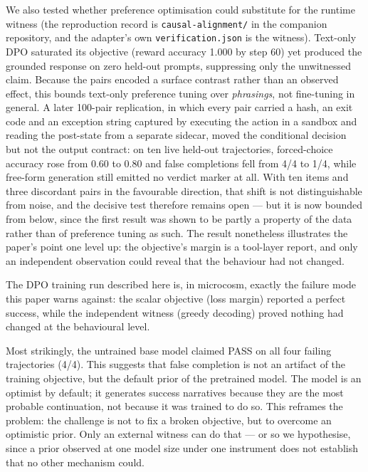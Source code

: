 \documentclass[11pt,a4paper]{article}
\newcounter{none}
\begin{document}
We also tested whether preference optimisation could substitute for the runtime
witness (the reproduction record is \texttt{causal-alignment/} in the companion
repository, and the adapter's own \texttt{verification.json} is the witness).
Text-only DPO saturated its objective (reward accuracy 1.000 by step 60) yet
produced the grounded response on zero held-out prompts, suppressing only the
unwitnessed claim. Because the pairs encoded a surface contrast rather than an
observed effect, this bounds text-only preference tuning over \emph{phrasings}, not
fine-tuning in general. A later 100-pair replication, in which every pair
carried a hash, an exit code and an exception string captured by executing the
action in a sandbox and reading the post-state from a separate sidecar, moved
the conditional decision but not the output contract: on ten live held-out
trajectories, forced-choice accuracy rose from 0.60 to 0.80 and false
completions fell from 4/4 to 1/4, while free-form generation still emitted no
verdict marker at all. With ten items and three discordant pairs in the
favourable direction, that shift is not distinguishable from noise, and the
decisive test therefore remains open --- but it is now bounded from below, since
the first result was shown to be partly a property of the data rather than of
preference tuning as such. The result nonetheless illustrates the paper's point
one level up: the objective's margin is a tool-layer report, and
only an independent observation could reveal that the behaviour had not changed.

The DPO training run described here is, in microcosm, exactly the failure mode
this paper warns against: the scalar objective (loss margin) reported a perfect
success, while the independent witness (greedy decoding) proved nothing had
changed at the behavioural level.

Most strikingly, the untrained base model claimed PASS on all four failing
trajectories (4/4). This suggests that false completion is not an artifact of
the training objective, but the default prior of the pretrained model. The model
is an optimist by default; it generates success narratives because they are the
most probable continuation, not because it was trained to do so. This reframes
the problem: the challenge is not to fix a broken objective, but to overcome an
optimistic prior. Only an external witness can do that --- or so we hypothesise,
since a prior observed at one model size under one instrument does not establish
that no other mechanism could.
\end{document}
